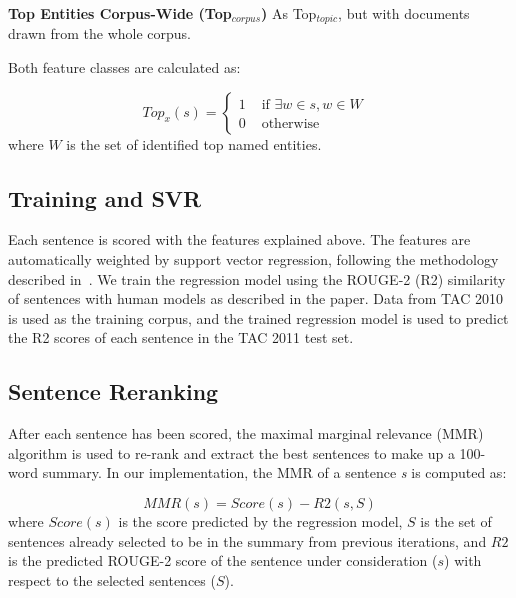 \textbf{Top Entities Corpus-Wide (Top$_{corpus}$)} As Top$_{topic}$, but with documents drawn from the whole corpus.

Both feature classes are calculated as:

\begin{equation*}
Top_{x}(s) = \left\{
\begin{array}{rl}
1 &\mbox{ if $\exists w \in s, w \in W$ } \\
0 &\mbox{ otherwise }
\end{array}
\right.
\end{equation*}
where $W$ is the set of identified top named entities.

\subsection{Training and SVR}
Each sentence is scored with the features explained above.
The features are automatically weighted by support vector regression, following the methodology described in~\cite{ICON_2009}. We train the regression model using the ROUGE-2 (R2) similarity of sentences with human models as described in the paper. Data from TAC 2010 is used as the training corpus, and the trained regression model is used to predict the R2 scores of each sentence in the TAC 2011 test set. 

\subsection{Sentence Reranking}

After each sentence has been scored, the maximal marginal relevance (MMR)~\cite{carbonell1998use} algorithm is used to re-rank and extract the best sentences to make up a 100-word summary. In our implementation, the MMR of a sentence \textit{s} is computed as:

\begin{equation*}
MMR(s) = Score(s) - R2(s, S)
\label{eqn:mmr1}
\end{equation*}
where $Score(s)$ is the score predicted by the regression model, $S$ is the set of sentences already selected to be in the summary from previous iterations, and $R2$ is the predicted ROUGE-2 score of the sentence under consideration ($s$) with respect to the selected sentences ($S$).


